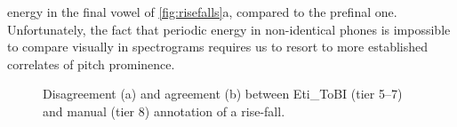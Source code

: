 energy in the final vowel of \autoref{fig:risefalls}a, compared to the prefinal one. Unfortunately, the fact that periodic energy in non-identical phones is impossible to compare visually in spectrograms requires us to resort to more established correlates of pitch prominence.

\begin{sidewaysfigure}
	\hspace{2em}%

	\caption[Disagreement (a) and agreement (b) between Eti\_ToBI (tier 5--7) and manual (tier 8) annotation of a rise-fall]{Disagreement (a) and agreement (b) between Eti\_ToBI (tier 5--7) and manual (tier 8) annotation of a rise-fall.}\label{fig:risefalls}
\end{sidewaysfigure}

